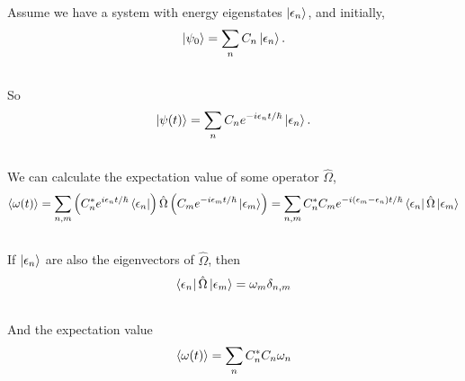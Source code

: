 \documentclass[letterpaper,10pt,english]{sphinxmanual}
\begin{document}
Assume we have a system with energy eigenstates $\left| \epsilon _ n\right\rangle$, and initially,
\begin{gather}
\begin{split}\left| \psi _ 0\right\rangle = \sum_n C _ n \left| \epsilon _ n\right\rangle .\end{split}\notag\\\begin{split}\end{split}\notag
\end{gather}
So
\begin{gather}
\begin{split}\left| \psi(t)\right\rangle = \sum _ n C _ n e^{-i\epsilon _ n t/\hbar} \left| \epsilon _ n\right\rangle .\end{split}\notag\\\begin{split}\end{split}\notag
\end{gather}
We can calculate the expectation value of some operator $\hat \Omega$,
\begin{gather}
\begin{split}\left< \omega (t) \right> =  \sum _ {n,m} \left( C _ n^ * e^{i\epsilon _ n t/\hbar } \left\langle \epsilon _ n\right| \right)  \hat \Omega \left( C _ m e^{-i \epsilon _ m t/\hbar} \left| \epsilon _ m\right\rangle \right) = \sum _ {n,m} C _ n ^* C _ m e^{-i(\epsilon _ m - \epsilon _ n) t/\hbar} \left\langle \epsilon _ n\right| \hat \Omega \left| \epsilon _ m\right\rangle\end{split}\notag\\\begin{split}\end{split}\notag
\end{gather}
If $\left| \epsilon _ n\right\rangle$ are also the eigenvectors of $\hat \Omega$, then
\begin{gather}
\begin{split}\left\langle \epsilon _ n\right| \hat \Omega \left| \epsilon _ m\right\rangle = \omega _ m \delta _ {n,m}\end{split}\notag\\\begin{split}\end{split}\notag
\end{gather}
And the expectation value
\begin{gather}
\begin{split}\left<  \omega (t) \right> = \sum _ {n} C _ n^* C _ n \omega _ n\end{split}\notag\\\begin{split}\end{split}\notag
\end{gather}
\end{document}
